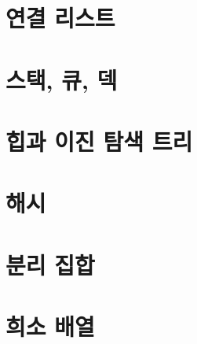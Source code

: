\chapter{연결 리스트}


\chapter{스택, 큐, 덱}


\chapter{힙과 이진 탐색 트리}


\chapter{해시}


\chapter{분리 집합}


\chapter{희소 배열}
